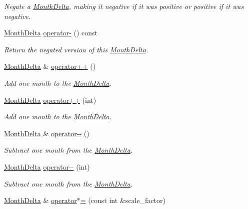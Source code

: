 \begin{DoxyCompactItemize}
\begin{DoxyCompactList}\small\item\em Negate a \hyperlink{structMonthDelta}{Month\-Delta}, making it negative if it was positive or positive if it was negative. \end{DoxyCompactList}\item 
\hyperlink{structMonthDelta}{Month\-Delta} \hyperlink{structMonthDelta_a5d754349cccfb68c729461b7a96d666f}{operator-\/} () const 
\begin{DoxyCompactList}\small\item\em Return the negated version of this \hyperlink{structMonthDelta}{Month\-Delta}. \end{DoxyCompactList}\item 
\hyperlink{structMonthDelta}{Month\-Delta} \& \hyperlink{structMonthDelta_a2d925db7f08eb18d1dcd4961d8149b48}{operator++} ()
\begin{DoxyCompactList}\small\item\em Add one month to the \hyperlink{structMonthDelta}{Month\-Delta}. \end{DoxyCompactList}\item 
\hyperlink{structMonthDelta}{Month\-Delta} \hyperlink{structMonthDelta_afcbef7f90cde7cf06a312da4acd5a1b9}{operator++} (int)
\begin{DoxyCompactList}\small\item\em Add one month to the \hyperlink{structMonthDelta}{Month\-Delta}. \end{DoxyCompactList}\item 
\hyperlink{structMonthDelta}{Month\-Delta} \& \hyperlink{structMonthDelta_a792c4dd313efad2aec9dc80b7d18dc4e}{operator-\/-\/} ()
\begin{DoxyCompactList}\small\item\em Subtract one month from the \hyperlink{structMonthDelta}{Month\-Delta}. \end{DoxyCompactList}\item 
\hyperlink{structMonthDelta}{Month\-Delta} \hyperlink{structMonthDelta_a57b2bfc986e466491dc6ae5546988de7}{operator-\/-\/} (int)
\begin{DoxyCompactList}\small\item\em Subtract one month from the \hyperlink{structMonthDelta}{Month\-Delta}. \end{DoxyCompactList}\item 
\hyperlink{structMonthDelta}{Month\-Delta} \& \hyperlink{structMonthDelta_a63ed19158fcd7fd743ecb4afb83ff874}{operator$\ast$=} (const int \&scale\-\_\-factor)

\end{DoxyCompactItemize}
